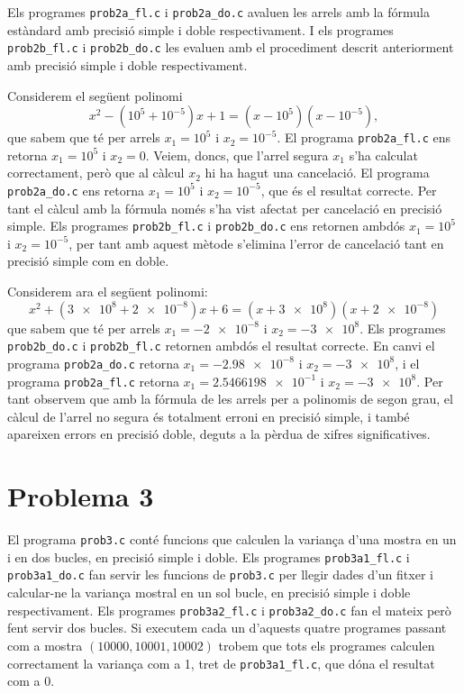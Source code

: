 \documentclass[12pt]{article}
\begin{document}
Els programes \texttt{prob2a\_fl.c} i \texttt{prob2a\_do.c} avaluen les arrels amb la fórmula estàndard amb precisió simple i doble respectivament. I els programes \texttt{prob2b\_fl.c} i \texttt{prob2b\_do.c} les evaluen amb el procediment descrit anteriorment amb precisió simple i doble respectivament.


Considerem el següent polinomi
\begin{equation*}
	x^2- (10^5 + 10^{-5})x +1=(x-10^5)(x-10^{-5}),
\end{equation*}
que sabem que té per arrels $x_1=10^5$ i $x_2=10^{-5}$. El programa \texttt{prob2a\_fl.c} ens retorna $x_1=10^5$ i $x_2=0$. Veiem, doncs, que l'arrel segura $x_1$ s'ha calculat correctament, però que al càlcul $x_2$ hi ha hagut una cancelació. El programa \texttt{prob2a\_do.c} ens retorna $x_1=10^5$ i $x_2=10^{-5}$, que és el resultat correcte. Per tant el càlcul amb la fórmula només s'ha vist afectat per cancelació en precisió simple. Els programes \texttt{prob2b\_fl.c} i \texttt{prob2b\_do.c} ens retornen ambdós $x_1=10^5$ i $x_2=10^{-5}$, per tant amb aquest mètode s'elimina l'error de cancelació tant en precisió simple com en doble.

Considerem ara el següent polinomi:
\begin{equation*}
	x^2 + (\num{3e8} + \num{2e-8})x + 6 = (x + \num{3e8})(x + \num{2e-8})
\end{equation*}
que sabem que té per arrels $x_1=\num{-2e-8}$ i $x_2=\num{-3e8}$. Els programes \texttt{prob2b\_do.c} i \texttt{prob2b\_fl.c} retornen ambdós el resultat correcte. En canvi el programa \texttt{prob2a\_do.c} retorna $x_1=\num{-2.98e-8}$ i $x_2=\num{-3e8}$, i el programa \texttt{prob2a\_fl.c} retorna $x_1=\num{2.5466198e-1}$ i $x_2=\num{-3e8}$. Per tant observem que amb la fórmula de les arrels per a polinomis de segon grau, el càlcul de l'arrel no segura és totalment erroni en precisió simple, i també apareixen errors en precisió doble, deguts a la pèrdua de xifres significatives.
\newpage

\section*{Problema 3}
El programa \texttt{prob3.c} conté funcions que calculen la variança d'una mostra en un i en dos bucles, en precisió simple i doble. Els programes \texttt{prob3a1\_fl.c} i \texttt{prob3a1\_do.c} fan servir les funcions de \texttt{prob3.c} per llegir dades d'un fitxer i calcular-ne la variança mostral en un sol bucle, en precisió simple i doble respectivament. Els programes \texttt{prob3a2\_fl.c} i \texttt{prob3a2\_do.c} fan el mateix però fent servir dos bucles. Si executem cada un d'aquests quatre programes passant com a mostra \( (\num{10000}, \num{10001}, \num{10002}) \) trobem que tots els programes calculen correctament la variança com a 1, tret de \texttt{prob3a1\_fl.c}, que dóna el resultat com a 0.
\end{document}
